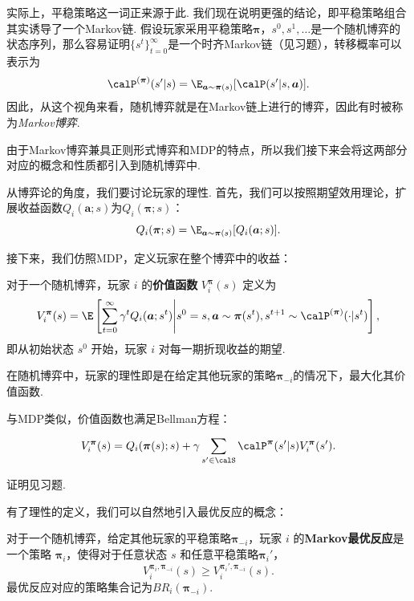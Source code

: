 实际上，平稳策略这一词正来源于此. 我们现在说明更强的结论，即平稳策略组合其实诱导了一个Markov链. 假设玩家采用平稳策略$\boldsymbol \pi$，$s^0,s^1,\dots$是一个随机博弈的状态序列，那么容易证明$\{s^t\}_{t=0}^{\infty}$是一个时齐Markov链（见习题），转移概率可以表示为
\[\calP^{(\boldsymbol \pi)}(s'|s)=\E_{\boldsymbol a\sim \boldsymbol \pi(s)}[\calP(s'|s,\boldsymbol a)].\]
因此，从这个视角来看，随机博弈就是在Markov链上进行的博弈，因此有时被称为\emph{Markov博弈}.

由于Markov博弈兼具正则形式博弈和MDP的特点，所以我们接下来会将这两部分对应的概念和性质都引入到随机博弈中.

从博弈论的角度，我们要讨论玩家的理性. 首先，我们可以按照期望效用理论，扩展收益函数$Q_i(\boldsymbol a;s)$为$Q_i(\boldsymbol \pi;s)$：
\[Q_i(\boldsymbol \pi;s)=\E_{\boldsymbol a\sim \boldsymbol \pi(s)}[Q_i(\boldsymbol a;s)].\]

接下来，我们仿照MDP，定义玩家在整个博弈中的收益：

\begin{definition}[价值函数]
    对于一个随机博弈，玩家 $i$ 的\textbf{价值函数} $V_i^{\boldsymbol \pi}(s)$ 定义为
    \[V_i^{\boldsymbol \pi}(s) = \E\left[\sum_{t=0}^{\infty} \gamma^t Q_i(\boldsymbol a; s^t)\middle| s^0=s, \boldsymbol a\sim \boldsymbol \pi(s^t), s^{t+1}\sim \calP^{(\boldsymbol \pi)}(\cdot|s^t)\right],\]
    即从初始状态 $s^0$ 开始，玩家 $i$ 对每一期折现收益的期望.
\end{definition}

在随机博弈中，玩家的理性即是在给定其他玩家的策略$\boldsymbol \pi_{-i}$的情况下，最大化其价值函数. 

与MDP类似，价值函数也满足Bellman方程：

\begin{theorem}[Bellman方程]
        \[V_i^{\boldsymbol \pi}(s) = Q_i(\boldsymbol \pi(s);s) + \gamma \sum_{s'\in \calS} \calP^{\boldsymbol\pi}(s'|s)V_i^{\boldsymbol \pi}(s').\]
\end{theorem}
证明见习题.

有了理性的定义，我们可以自然地引入最优反应的概念：

\begin{definition}[Markov最优反应]
    对于一个随机博弈，给定其他玩家的平稳策略$\boldsymbol \pi_{-i}$，玩家 $i$ 的\textbf{Markov最优反应}是一个策略 $\boldsymbol \pi_i$，使得对于任意状态 $s$ 和任意平稳策略$\boldsymbol \pi_i'$，
    \[V_i^{\boldsymbol \pi_i,\boldsymbol \pi_{-i}}(s)\geq V_i^{\boldsymbol \pi_i',\boldsymbol \pi_{-i}}(s).\]
    最优反应对应的策略集合记为$BR_i(\boldsymbol \pi_{-i})$.
\end{definition}

